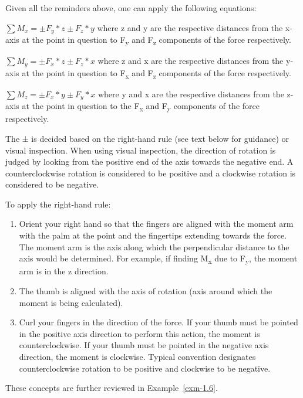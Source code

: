 \documentclass[
  letterpaper,
  DIV=11,
  numbers=noendperiod]{scrreprt}
\theoremstyle{definition}
\theoremstyle{remark}
\begin{document}
Given all the reminders above, one can apply the following equations:

\(\sum M_x= \pm F_y * z \pm F_z * y\) where z and y are the respective
distances from the x-axis at the point in question to F\textsubscript{y}
and F\textsubscript{z} components of the force respectively.

\(\sum M_y= \pm F_x * z \pm F_z * x\) where z and x are the respective
distances from the y-axis at the point in question to F\textsubscript{x}
and F\textsubscript{z} components of the force respectively.

\(\sum M_z= \pm F_x * y \pm F_y * x\) where y and x are the respective
distances from the z-axis at the point in question to the
F\textsubscript{x} and F\textsubscript{y} components of the force
respectively.

The ± is decided based on the right-hand rule (see text below for
guidance) or visual inspection. When using visual inspection, the
direction of rotation is judged by looking from the positive end of the
axis towards the negative end. A counterclockwise rotation is considered
to be positive and a clockwise rotation is considered to be negative.

To apply the right-hand rule:

\begin{enumerate}
\def\labelenumi{\arabic{enumi}.}
\item
  Orient your right hand so that the fingers are aligned with the moment
  arm with the palm at the point and the fingertips extending towards
  the force. The moment arm is the axis along which the perpendicular
  distance to the axis would be determined. For example, if finding
  M\textsubscript{x} due to F\textsubscript{y}, the moment arm is in the
  z direction.
\item
  The thumb is aligned with the axis of rotation (axis around which the
  moment is being calculated).
\item
  Curl your fingers in the direction of the force. If your thumb must be
  pointed in the positive axis direction to perform this action, the
  moment is counterclockwise. If your thumb must be pointed in the
  negative axis direction, the moment is clockwise. Typical convention
  designates counterclockwise rotation to be positive and clockwise to
  be negative.
\end{enumerate}

These concepts are further reviewed in Example~\ref{exm-1.6}.
\end{document}
